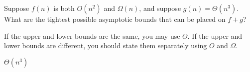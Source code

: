 \begin{prob}
    Suppose $f(n)$ is both $O(n^2)$ and $\Omega(n)$, and suppose $g(n) = \Theta(n^3)$.
    What are the tightest possible asymptotic bounds that can
    be placed on $f + g$?

    If the upper and lower bounds are the same, you may use $\Theta$. If the
    upper and lower bounds are different, you should state them separately
    using $O$ and $\Omega$.

    \begin{soln}
        $\Theta(n^3)$
    \end{soln}
\end{prob}
